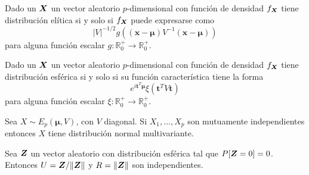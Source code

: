 \begin{nprop}
  Dado un $\boldsymbol{X}$ un vector aleatorio $p$-dimensional con función de densidad $f_{\boldsymbol{X}}$ tiene distribución elítica si y solo si $f_{\boldsymbol{X}}$ puede expresarse como \[|V|^{-1/2}g\left((\boldsymbol x - \boldsymbol \mu)V^{-1}(\boldsymbol x - \boldsymbol \mu)\right)\] para alguna función escalar $g : \mathbb R_0^+ \to \mathbb R_0^+$.
\end{nprop}

\begin{nprop}
  Dado un $\boldsymbol{X}$ un vector aleatorio $p$-dimensional con función de densidad $f_{\boldsymbol{X}}$ tiene distribución esférica si y solo si su función característica tiene la forma \[e^{i \boldsymbol t^T \boldsymbol \mu}\xi(\boldsymbol t^T V \boldsymbol t)\] para alguna función escalar $\xi: \mathbb R_0^+ \to \mathbb R_0^+$.
\end{nprop}


\begin{nprop}
  Sea $X \sim E_p(\boldsymbol \mu, V)$, con $V$ diagonal. Si $X_1, \dots, X_p$ son mutuamente independientes entonces $X$ tiene distribución normal multivariante.
\end{nprop}

\begin{nprop}
  Sea $\boldsymbol{Z}$ un vector aleatorio con distribución esférica tal que $P[\boldsymbol{Z} = 0] = 0$. Entonces $U = \boldsymbol{Z}/\Vert\boldsymbol{Z}\Vert$ y $R = \Vert\boldsymbol{Z}\Vert$ son independientes.
\end{nprop}

